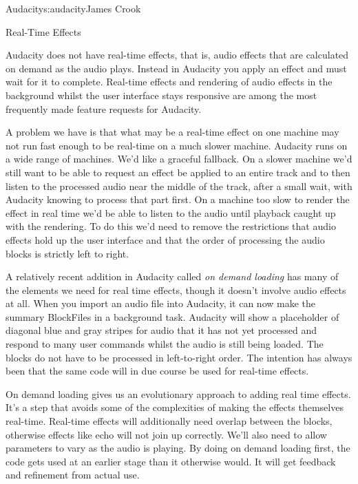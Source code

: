 \begin{aosachapter}{Audacity}{s:audacity}{James Crook}
\begin{aosasect1}{Real-Time Effects}

Audacity does not have real-time effects, that is, audio effects that
are calculated on demand as the audio plays.  Instead in Audacity you
apply an effect and must wait for it to complete.  Real-time effects
and rendering of audio effects in the background whilst the user
interface stays responsive are among the most frequently made
feature requests for Audacity.

A problem we have is that what may be a real-time effect on one
machine may not run fast enough to be real-time on a much slower
machine.  Audacity runs on a wide range of machines.  We'd like a
graceful fallback.  On a slower machine we'd still want to be able to
request an effect be applied to an entire track and to then listen to
the processed audio near the middle of the track, after a small wait,
with Audacity knowing to process that part first.  On a machine too
slow to render the effect in real time we'd be able to listen to the
audio until playback caught up with the rendering.  To do this we'd
need to remove the restrictions that audio effects hold up the user
interface and that the order of processing the audio blocks is
strictly left to right.

A relatively recent addition in Audacity called \emph{on demand loading}
has many of the elements we need for real time effects, though it
doesn't involve audio effects at all.  When you import an audio file
into Audacity, it can now make the summary BlockFiles in a background
task.  Audacity will show a placeholder of diagonal blue and gray
stripes for audio that it has not yet processed and respond to many
user commands whilst the audio is still being loaded.  The blocks do
not have to be processed in left-to-right order.  The intention has
always been that the same code will in due course be used for
real-time effects.

On demand loading gives us an evolutionary approach to adding real
time effects.  It's a step that avoids some of the complexities of
making the effects themselves real-time.  Real-time effects will
additionally need overlap between the blocks, otherwise effects like
echo will not join up correctly.  We'll also need to allow parameters
to vary as the audio is playing.  By doing on demand loading first,
the code gets used at an earlier stage than it otherwise would.  It
will get feedback and refinement from actual use.

\end{aosasect1}


\end{aosachapter}
